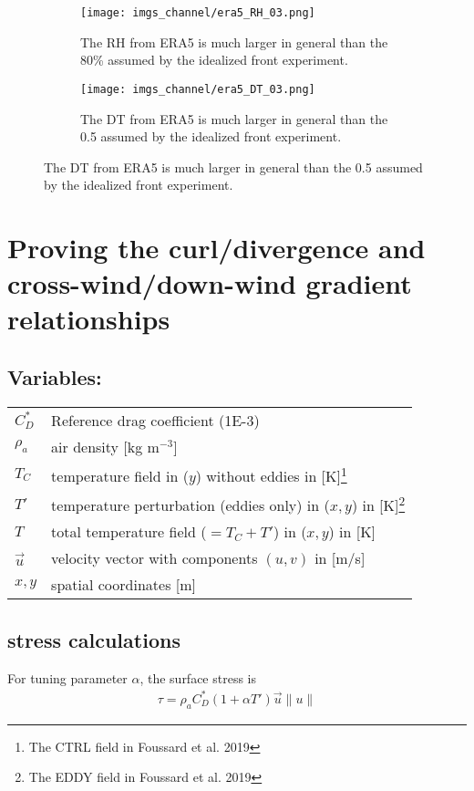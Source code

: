 \documentclass[12pt,a4paper]{article}
\begin{document}
\begin{figure}[h!]
\centering
\begin{subfigure}[t]{0.49\textwidth}
\texttt{[image: imgs\_channel/era5\_RH\_03.png]}
\caption{The RH from ERA5 is much larger in general than the 80\% assumed by the idealized front experiment.}
\end{subfigure}
\begin{subfigure}[t]{0.49\textwidth}
\texttt{[image: imgs\_channel/era5\_DT\_03.png]}
\caption{The DT from ERA5 is much larger in general than the 0.5 assumed by the idealized front experiment.}
\end{subfigure}

\end{figure}






\appendix
\section{Proving the curl/divergence and cross-wind/down-wind gradient relationships}
\subsection*{Variables:}
\begin{table}[h!]
\begin{tabular}{ll}
 $C_D^*$ &  Reference drag coefficient (1E-3) \\
 $\rho_a$ &  air density [kg m$^{-3}$] \\
 $T_C$ & temperature field in ($y$) without eddies in [K]\footnote{The CTRL field in Foussard et al. 2019}  \\
 $T'$ & temperature perturbation (eddies only) in ($x,y$) in [K]\footnote{The EDDY field in Foussard et al. 2019}  \\
  $T$ & total temperature field ($=T_C + T'$) in ($x,y$) in [K]  \\
 $\vec{u}$ & velocity vector with components $(u,v)$ in [m/s] \\
 $x,y$ & spatial coordinates [m]
\end{tabular}
\end{table}

\subsection{stress calculations}
For tuning parameter $\alpha$, the surface stress is 
\begin{align*}
\tau = \rho_a C_D^*(1+\alpha T')\vec{u}\lVert u \rVert
\end{align*}
\end{document}
